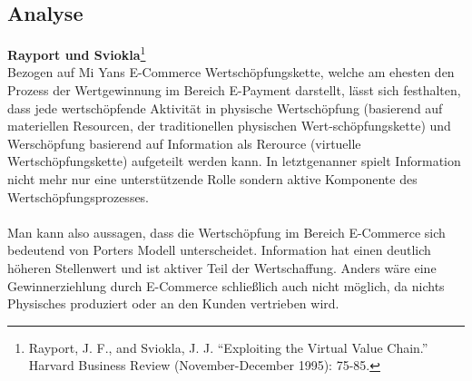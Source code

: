 \subsection{Analyse}
\textbf{Rayport und Sviokla}\footnote{Rayport, J. F., and Sviokla, J. J. “Exploiting the Virtual Value Chain.” Harvard Business Review (November-December 1995): 75-85.}\\
Bezogen auf Mi Yans E-Commerce Wertschöpfungskette, welche am ehesten den Prozess der Wertgewinnung im Bereich E-Payment darstellt, lässt sich festhalten, dass jede wertschöpfende Aktivität in physische Wertschöpfung (basierend auf materiellen Resourcen, der traditionellen physischen Wert-schöpfungskette) und Werschöpfung basierend auf Information als Rerource (virtuelle Wertschöpfungskette) aufgeteilt werden kann. In letztgenanner spielt Information nicht mehr nur eine unterstützende Rolle sondern aktive Komponente des Wertschöpfungsprozesses.\\
\\
Man kann also aussagen, dass die Wertschöpfung im Bereich E-Commerce sich bedeutend von Porters Modell unterscheidet. Information hat einen deutlich höheren Stellenwert und ist aktiver Teil der Wertschaffung. Anders wäre eine Gewinnerziehlung durch E-Commerce schließlich auch nicht möglich, da nichts Physisches produziert oder an den Kunden vertrieben wird.
